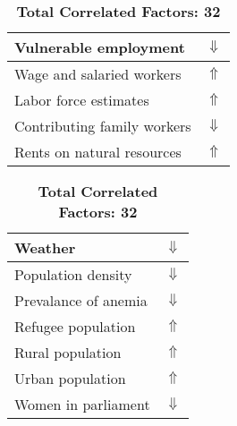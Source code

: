 \documentclass[12pt,notitlepage,oneside]{report}
\begin{document}
\begin{table}[!htb]
\begin{tabular}{|l|l|}
Vulnerable employment & $\Downarrow$\\ \hline
Wage and salaried workers & $\Uparrow$\\ \hline
Labor force estimates & $\Uparrow$\\ \hline
Contributing family workers & $\Downarrow$\\ \hline
Rents on natural resources & $\Uparrow$\\ \hline
\end{tabular}
\begin{tabular}{|l|l|}
\hline
Weather & $\Downarrow$\\ \hline
Population density & $\Downarrow$\\ \hline
Prevalance of anemia & $\Downarrow$\\ \hline
Refugee population & $\Uparrow$\\ \hline
Rural population & $\Uparrow$\\ \hline
Urban population & $\Uparrow$\\ \hline
Women in parliament & $\Downarrow$\\ \hline
\end{tabular}
\caption*{\textbf{Total Correlated Factors: 32}}
\end{table}
\clearpage
\end{document}
